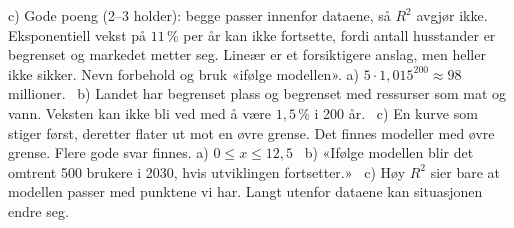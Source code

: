 c) Gode poeng (2–3 holder): begge passer innenfor dataene, så $R^2$ avgjør ikke. Eksponentiell vekst på $11\,\%$ per år kan ikke fortsette, fordi antall husstander er begrenset og markedet metter seg. Lineær er et forsiktigere anslag, men heller ikke sikker. Nevn forbehold og bruk «ifølge modellen».
 a) $5 \cdot 1{,}015^{200} \approx 98$ millioner. \ b) Landet har begrenset plass og begrenset med ressurser som mat og vann. Veksten kan ikke bli ved med å være $1{,}5\,\%$ i 200 år. \ c) En kurve som stiger først, deretter flater ut mot en øvre grense. Det finnes modeller med øvre grense. Flere gode svar finnes.
 a) $0 \le x \le 12{,}5$ \ b) «Ifølge modellen blir det omtrent 500 brukere i 2030, hvis utviklingen fortsetter.» \ c) Høy $R^2$ sier bare at modellen passer med punktene vi har. Langt utenfor dataene kan situasjonen endre seg.


